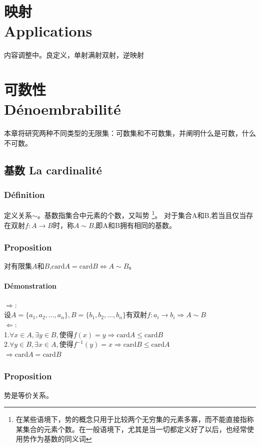 \documentclass[12pt, a4paper, oneside]{ctexbook}
\begin{document}
\chapter{映射\\ Applications}%
内容调整中。良定义，单射满射双射，逆映射

\chapter{可数性\\ Dénoembrabilité}
  本章将研究两种不同类型的无限集：可数集和不可数集，并阐明什么是可数，什么不可数。
\section{基数 La cardinalité}
  \subsection{Définition}
  定义关系$\sim$。基数指集合中元素的个数，又叫势
  \footnote{在某些语境下，势的概念只用于比较两个无穷集的元素多寡，而不能直接指称某集合的元素个数。在一般语境下，尤其是当一切都定义好了以后，也经常使用势作为基数的同义词}。
  对于集合A和B,若当且仅当存在双射$f:A\rightarrow B$时，称$A\sim B$,即A和B拥有相同的基数。
  \subsection{Proposition}\label{myref:youxianji}
  对有限集$A$和$B$,$\text{card}A=\text{card}B\Leftrightarrow A\sim B$。
  \subsubsection{Démonstration}
  \noindent $\Rightarrow$:\\
  设$A=\{a_1,a_2,\dots,a_n\},B=\{b_1,b_2,\dots,b_n\}$有双射$f:a_i\rightarrow b_i\Rightarrow A\sim B$\\

  \noindent $\Leftarrow$:\\
  1.$\forall x\in A, \exists y\in B,\text{使得} f(x)=y\Rightarrow\text{card}A\leq\text{card}B$\\
  2.$\forall y\in B, \exists x\in A,\text{使得} f^{-1}(y)=x\Rightarrow\text{card}B\leq\text{card}A$\\
  $\Rightarrow \text{card}A=\text{card}B$
  \subsection{Proposition}\label{myref:carddengjia}
  势是等价关系。
\end{document}
